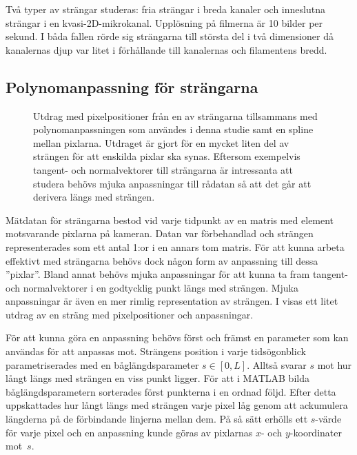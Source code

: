 Två typer av strängar studeras: fria strängar i breda kanaler och inneslutna strängar i en kvasi-2D-mikrokanal. Upplösning på filmerna är 10 bilder per sekund. I båda fallen rörde sig strängarna till största del i två dimensioner då kanalernas djup var litet i förhållande till kanalernas och filamentens bredd.


\subsection{Polynomanpassning för strängarna} \label{sec:polynomanpassning}

\begin{figure}\centering

\caption{
Utdrag med pixelpositioner från en av strängarna tillsammans med polynomanpassningen som användes i denna studie samt en spline mellan pixlarna. Utdraget är gjort för en mycket liten del av strängen för att enskilda pixlar ska synas.
Eftersom exempelvis tangent- och normalvektorer till strängarna är intressanta att studera behövs mjuka anpassningar till rådatan så att det går att derivera längs med strängen. 
}
\label{fig:strang_anpassning}
\end{figure}

Mätdatan för strängarna bestod vid varje tidpunkt av en matris med element motsvarande pixlarna på kameran. Datan var förbehandlad och strängen representerades som ett antal 1:or i en annars tom matris. 
För att kunna arbeta effektivt med strängarna behövs dock någon form av anpassning till dessa ''pixlar''. Bland annat behövs mjuka anpassningar för att kunna ta fram tangent- och normalvektorer i en godtycklig punkt längs med strängen. Mjuka anpassningar är även en mer rimlig representation av strängen. I  visas ett litet utdrag av en sträng med pixelpositioner och anpassningar. 

För att kunna göra en anpassning behövs först och främst en parameter som kan användas för att anpassas mot. 
Strängens position i varje tidsögonblick parametriserades med en båglängdsparameter $s\in[0,L]$. Alltså svarar $s$ mot hur långt längs med strängen en viss punkt ligger. 
För att i MATLAB bilda båglängdsparametern sorterades först punkterna i en ordnad följd. Efter detta uppskattades hur långt längs med strängen varje pixel låg genom att ackumulera längderna på de förbindande linjerna mellan dem. På så sätt erhölls ett $s$-värde för varje pixel och en anpassning kunde göras av pixlarnas $x$- och $y$-koordinater mot~$s$.

